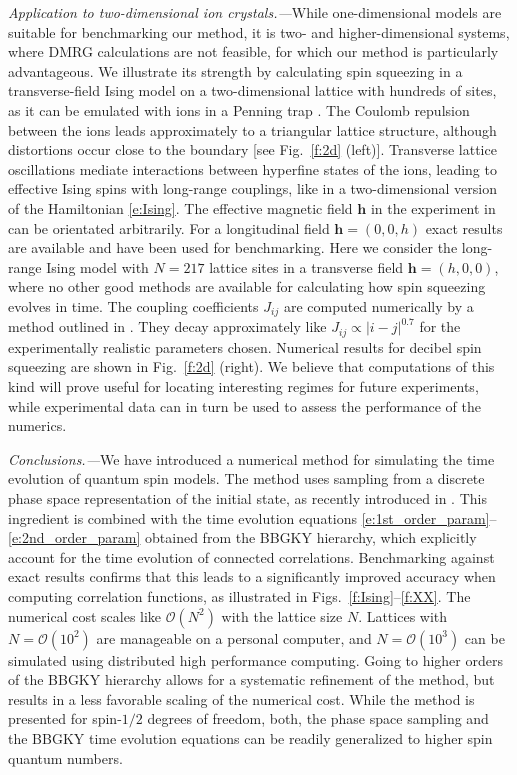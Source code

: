 \documentclass[aps,prl,showpacs,amsmath,amssymb,superscriptaddress,reprint,10pt]{revtex4-1}
\newcommand{\mvec}[1]{\boldsymbol #1}
\begin{document}
{\em Application to two-dimensional ion crystals.---}While one-dimensional models are suitable for benchmarking our method, it is two- and higher-dimensional systems, where DMRG calculations are not feasible, for which our method is particularly advantageous. We illustrate its strength by calculating spin squeezing in a transverse-field Ising model on a two-dimensional lattice with hundreds of sites, as it can be emulated with ions in a Penning trap \cite{Britton_etal12}. The Coulomb repulsion between the ions leads approximately to a triangular lattice structure, although distortions occur close to the boundary [see Fig.~\ref{f:2d} (left)]. Transverse lattice oscillations mediate interactions between hyperfine states of the ions, leading to effective Ising spins with long-range couplings, like in a two-dimensional version of the Hamiltonian \eqref{e:Ising}. The effective magnetic field $\mvec{h}$ in the experiment in \cite{Britton_etal12} can be orientated arbitrarily. For a longitudinal field $\mvec{h}=(0,0,h)$ 
exact results are available 
and have been used for benchmarking. Here we consider the long-range Ising model with $N=217$ lattice sites in a transverse field $\mvec{h}=(h,0,0)$, where no other good methods are available for calculating how spin squeezing evolves in time. The coupling coefficients $J_{ij}$ are computed numerically by a method outlined in \cite{Britton_etal12}. They decay approximately like $J_{ij}\propto|i-j|^{0.7}$ for the experimentally realistic parameters chosen. Numerical results for decibel spin squeezing are shown in Fig.~\ref{f:2d} (right). We believe that computations of this kind will prove useful for locating interesting regimes for future experiments, while experimental data can in turn be used to assess the performance of the numerics.


{\em Conclusions.---}We have introduced a numerical method for simulating the time evolution of quantum spin models. The method uses sampling from a discrete phase space representation of the initial state, as recently introduced in \cite{Schachenmayer_etal15}. This ingredient is combined with the time evolution equations \eqref{e:1st_order_param}--\eqref{e:2nd_order_param} obtained from the BBGKY hierarchy, which explicitly account for the time evolution of connected correlations. Benchmarking against exact results confirms that this leads to a significantly improved accuracy when computing correlation functions, as illustrated in Figs.~\ref{f:Ising}--\ref{f:XX}. The numerical cost scales like $\mathscr{O}(N^2)$ with the lattice size $N$. Lattices with $N=\mathscr{O}(10^2)$ are manageable on a personal computer, and $N=\mathscr{O}(10^3)$ can be simulated using distributed high performance computing. Going to higher orders of the BBGKY hierarchy allows for a systematic refinement of the method, but 
results in a less favorable 
scaling of the numerical cost. While 
the method is presented for spin-$1/2$ degrees of freedom, both, the phase space sampling and the BBGKY time evolution equations can be readily generalized to higher spin quantum numbers.
\end{document}
